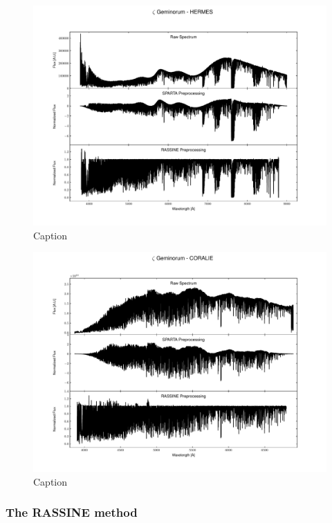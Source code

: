         \begin{figure}[H]
        \centering
        \includegraphics[width=\textwidth]{report/images/chap3_methods/zetgem_preprocessing_hermes.pdf}
        \caption{Caption}
        \label{3.3a}
        \end{figure}

        \begin{figure}[H]
        \centering
        \includegraphics[width=\textwidth]{report/images/chap3_methods/zetgem_preprocessing_coralie14.pdf}
        \caption{Caption}
        \label{3.3b}
        \end{figure}
    
    \subsubsection{The RASSINE method}
